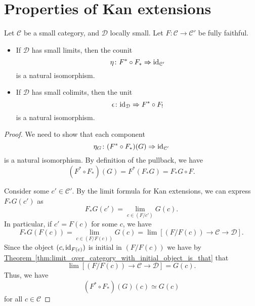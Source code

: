 \documentclass[main.tex]{subfiles}
\begin{document}
\section{Properties of Kan extensions}
\label{sec:properties_of_kan_extensions}

\begin{theorem}
  \label{thm:kan_extension_along_fully_faithful_functor_counit_isomorphism}
  Let $\mathcal{C}$ be a small category, and $\mathcal{D}$ locally small. Let $F\colon \mathcal{C} \to \mathcal{C'}$ be fully faithful.
  \begin{itemize}
    \item If $\mathcal{D}$ has small limits, then the counit
      \begin{equation*}
        \eta\colon F^{*} \circ F_{*} \Rightarrow \mathrm{id}_{\mathcal{C}'}
      \end{equation*}
      is a natural isomorphism.

    \item If $\mathcal{D}$ has small colimits, then the unit
      \begin{equation*}
        \epsilon\colon \mathrm{id}_{\mathcal{D}} \Rightarrow F^{*} \circ F_{!}
      \end{equation*}
      is a natural isomorphism.
  \end{itemize}
\end{theorem}
\begin{proof}
  We need to show that each component
  \begin{equation*}
    \eta_{G}\colon (F^{*} \circ F_{*})(G) \Rightarrow \mathrm{id}_{\mathcal{C}'}
  \end{equation*}
  is a natural isomorphism. By definition of the pullback, we have
  \begin{equation*}
    (F^{*} \circ F_{*})(G) = F^{*}(F_{*}G) = F_{*}G \circ F.
  \end{equation*}

  Consider some $c' \in \mathcal{C}'$. By the limit formula for Kan extensions, we can express $F_{*}G(c')$ as
  \begin{equation*}
    F_{*}G(c') = \lim_{c \in (F / c')} G(c).
  \end{equation*}
  In particular, if $c' = F(c)$ for some $c$, we have
  \begin{equation*}
    F_{*}G(F(c)) = \lim_{c \in (F / F(c))} G(c) = \lim\left[ (F / F(c)) \to \mathcal{C} \to \mathcal{D} \right].
  \end{equation*}
  Since the object $(c, \mathrm{id}_{F(c)})$ is initial in $(F / F(c))$ we have by \hyperref[thm:limit_over_category_with_initial_object_is_that]{Theorem~\ref*{thm:limit_over_category_with_initial_object_is_that}} that
  \begin{equation*}
    \lim\left[ (F / F(c)) \to \mathcal{C} \to \mathcal{D} \right] = G(c).
  \end{equation*}
  Thus, we have
  \begin{equation*}
    (F^{*} \circ F_{*})(G)(c) \simeq G(c)
  \end{equation*}
  for all $c \in \mathcal{C}$
\end{proof}
\end{document}
